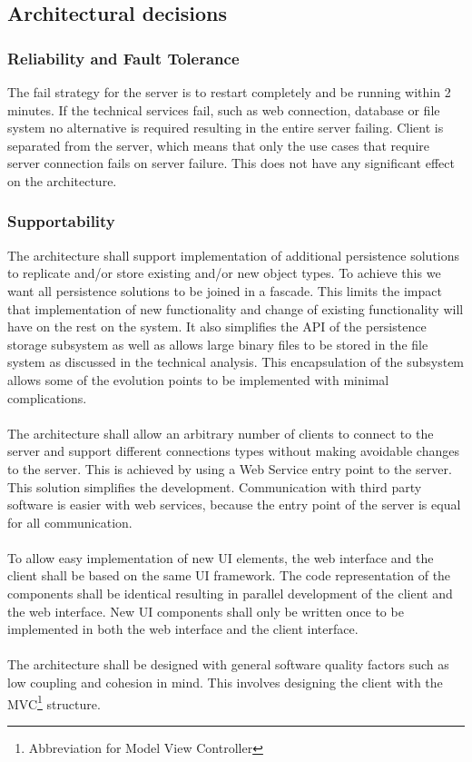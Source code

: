 \documentclass[a4paper,11pt,report]{report}
\begin{document}
\subsection{Architectural decisions}
\subsubsection{Reliability and Fault Tolerance}
The fail strategy for the server is to restart completely and be running within 2 minutes. If the technical services fail, such as web connection, database or file system no alternative is required resulting in the entire server failing. Client is separated from the server, which means that only the use cases that require server connection fails on server failure. This does not have any significant effect on the architecture.
\subsubsection{Supportability}
The architecture shall support implementation of additional persistence solutions to replicate and/or store existing and/or new object types. To achieve this we want all persistence solutions to be joined in a fascade. This limits the impact that implementation of new functionality and change of existing functionality will have on the rest on the system. It also simplifies the API of the persistence storage subsystem as well as allows large binary files to be stored in the file system as discussed in the technical analysis. This encapsulation of the subsystem allows some of the evolution points to be implemented with minimal complications. \\ \\
The architecture shall allow an arbitrary number of clients to connect to the server and support different connections types without making avoidable changes to the server. This is achieved by using a Web Service entry  point to the server. This solution simplifies the development. Communication with third party software is easier with web services, because the entry point of the server is equal for all communication.\\ \\
To allow easy implementation of new UI elements, the web interface and the client shall be based on the same UI framework. The code representation of the components shall be identical resulting in parallel development of the client and the web interface. New UI components shall only be written once to be implemented in both the web interface and the client interface. \\ \\
The architecture shall be designed with general software quality factors such as low coupling and cohesion in mind. This involves designing the client with the MVC\footnote[9]{Abbreviation for Model View Controller} structure. 
\end{document}
